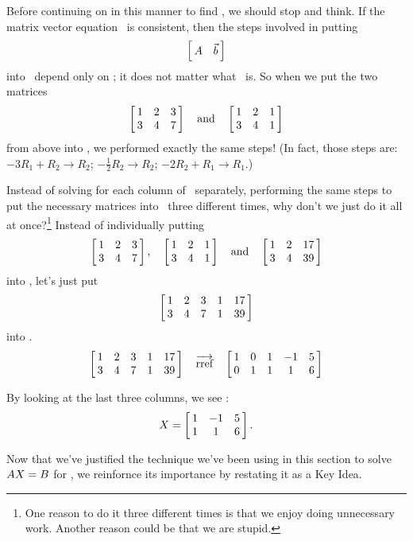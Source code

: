 Before continuing on in this manner to find , we should stop and think. If the matrix vector equation \ttaxb\ is consistent, then the steps involved in putting $$\bmx{cc}\tta & \vb\emx$$ into \rref\ depend only on \tta; it does not matter what \vb\ is. So when we put the two matrices $$\bmx{ccc}1&2&3\\3&4&7\emx \quad \text{and} \quad \bmx{ccc}1&2&1\\3&4&1\emx $$ from above into \rref, we performed exactly the same steps! (In fact, those steps are: $-3R_1+R_2\rightarrow R_2$; $-\frac12R_2\rightarrow R_2$; $-2R_2+R_1\rightarrow R_1$.)

Instead of solving for each column of \ttx\ separately, performing the same steps to put the necessary matrices into \rref\ three different times, why don't we just do it all at once?\footnote{One reason to do it three different times is that we enjoy doing unnecessary work. Another reason could be that we are stupid.} Instead of individually putting $$\bmx{ccc}1&2&3\\3&4&7\emx, \quad \bmx{ccc}1&2&1\\3&4&1\emx \quad \text{and} \quad \bmx{ccc}1&2&17\\3&4&39\emx$$ into \rref, let's just put $$\bmx{ccccc}1&2&3&1&17\\3&4&7&1&39\emx$$ into \rref.
$$\bmx{ccccc}1&2&3&1&17\\3&4&7&1&39\emx \quad \arref \quad \bmx{ccccc}1&0&1&-1&5\\0&1&1&1&6\emx$$

By looking at the last three columns, we see \ttx: $$\ttx = \bmx{ccc}1&-1&5\\1&1&6\emx.$$


Now that we've justified the technique we've been using in this section to solve $\tta\ttx=\ttb$ for \ttx, we reinfornce its importance by restating it as a Key Idea.

	
